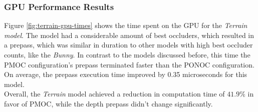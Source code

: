 \subsubsection*{GPU Performance Results} \label{subsubsec-gpu-performance-results-terrain}

Figure \ref{fig:terrain-gpu-times} shows the time spent on the \ac{GPU} for the \emph{Terrain model}.
The model had a considerable amount of best occluders, which resulted in a prepass, which was similar 
in duration to other models with high best occluder counts, like the \emph{Bunny}. In contrast to 
the models discussed before, this time the \ac{PMOC} configuration's prepass terminated faster 
than the \ac{PONOC} configuration. On average, the prepass execution time improved by 0.35 
microseconds for this model. \\

\noindent
Overall, the \emph{Terrain} model achieved a reduction in computation time of $41.9\%$ in favor of 
\ac{PMOC}, while the depth prepass didn't change significantly.


